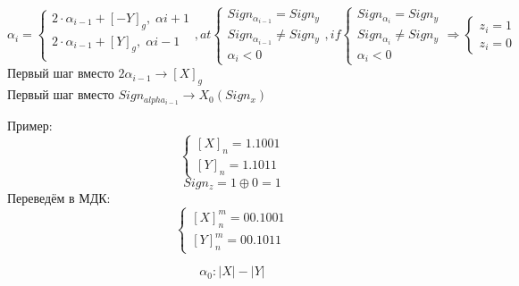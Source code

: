 \documentclass[12px]{article}
\begin{document}
\[ \alpha_i = 
\begin{cases}
	2\cdot\alpha_{i-1} + [-Y]_g,\; \alpha{i+1}\\
	2\cdot\alpha_{i-1} + [Y]_g,\; \alpha{i-1} \\
\end{cases}, at 
\begin{cases}
	Sign_{\alpha_{i-1}} = Sign_y \\
	Sign_{\alpha_{i-1}} \not= Sign_y \\
	\alpha_i < 0
\end{cases}, if 
\begin{cases}
	Sign_{\alpha_{i}} = Sign_y\\
	Sign_{\alpha_{i}} \not= Sign_y \\
	\alpha_i < 0
\end{cases} \Rightarrow
\begin{cases}
	z_i= 1\\
	z_i = 0
\end{cases}
\]
Первый шаг вместо $2\alpha_{i-1} \to [X]_g$\\
Первый шаг вместо $Sign_{alpha_{i-1}} \to X_0 (Sign_x)$

Пример:
\[ \begin{cases}
	[X]_n = 1.1001\\
	[Y]_n = 1.1011
\end{cases} \] 
\[ Sign_z = 1  \oplus 0 = 1 \]
Переведём в МДК:
\[ \begin{cases}
	[X]_n^m = 00.1001\\
	[Y]_n^m = 00.1011
\end{cases} \] 

\[\alpha_0: |X| - |Y| \]
\end{document}
